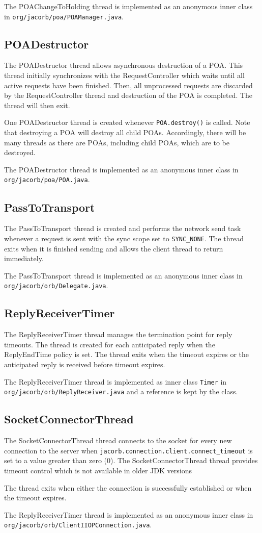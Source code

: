 The POAChangeToHolding thread is implemented as an anonymous inner class in
{\tt org/jacorb/poa/POAManager.java}.

\subsection*{POADestructor}
The POADestructor thread allows asynchronous destruction of a POA. This thread
initially synchronizes with the RequestController which waits until all active
requests have been finished. Then, all unprocessed requests are discarded
by the RequestController thread and destruction of the POA is completed. The
thread will then exit.

One POADestructor thread is created whenever {\tt POA.destroy()} is called.
Note that destroying a POA will destroy all child POAs. Accordingly, there will
be many threads as there are POAs, including child POAs, which are to be
destroyed.

The POADestructor thread is implemented as an anonymous inner class in
{\tt org/jacorb/poa/POA.java}.

\subsection*{PassToTransport}
The PassToTransport thread is created and performs the network send task
whenever a request is sent with the sync scope set to {\tt SYNC\_NONE}. The
thread exits when it is finished sending and allows the client thread to return
immediately.

The PassToTransport thread is implemented as an anonymous inner class in
{\tt org/jacorb/orb/Delegate.java}.

\subsection*{ReplyReceiverTimer}
The ReplyReceiverTimer thread manages the termination point for reply timeouts.
The thread is created for each anticipated reply when the ReplyEndTime
policy is set. The thread exits when the timeout expires or the
anticipated reply is received before timeout expires.

The ReplyReceiverTimer thread is implemented as inner class {\tt Timer} in
{\tt org/jacorb/orb/ReplyReceiver.java} and a reference is kept by the class.

\subsection*{SocketConnectorThread}
The SocketConnectorThread thread connects to the socket for every new
connection to the server when {\tt jacorb.connection.client.connect\_timeout}
is set to a value greater than zero (0). The SocketConnectorThread thread
provides timeout control which is not available in older JDK versions

The thread exits when either the connection is successfully established or
when the timeout expires.

The ReplyReceiverTimer thread is implemented as an anonymous inner class in
{\tt org/jacorb/orb/ClientIIOP\-Connection.java}.

